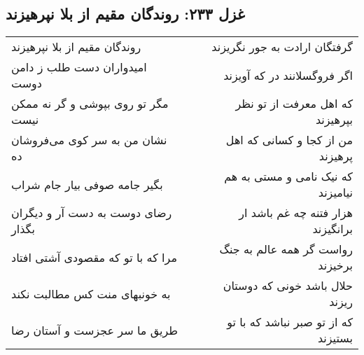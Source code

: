 \begin{center}
\section*{غزل ۲۳۳: روندگان مقیم از بلا نپرهیزند}
\label{sec:233}
\begin{longtable}{l p{0.5cm} r}
روندگان مقیم از بلا نپرهیزند
&&
گرفتگان ارادت به جور نگریزند
\\
امیدواران دست طلب ز دامن دوست
&&
اگر فروگسلانند در که آویزند
\\
مگر تو روی بپوشی و گر نه ممکن نیست
&&
که اهل معرفت از تو نظر بپرهیزند
\\
نشان من به سر کوی می‌فروشان ده
&&
من از کجا و کسانی که اهل پرهیزند
\\
بگیر جامه صوفی بیار جام شراب
&&
که نیک نامی و مستی به هم نیامیزند
\\
رضای دوست به دست آر و دیگران بگذار
&&
هزار فتنه چه غم باشد ار برانگیزند
\\
مرا که با تو که مقصودی آشتی افتاد
&&
رواست گر همه عالم به جنگ برخیزند
\\
به خونبهای منت کس مطالبت نکند
&&
حلال باشد خونی که دوستان ریزند
\\
طریق ما سر عجزست و آستان رضا
&&
که از تو صبر نباشد که با تو بستیزند
\\
\end{longtable}
\end{center}

